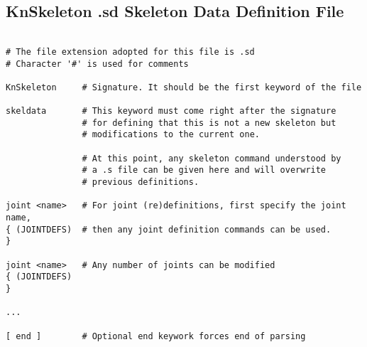 \subsection{KnSkeleton .sd Skeleton Data Definition File}

\begin{lstlisting}[title={}]

# The file extension adopted for this file is .sd
# Character '#' is used for comments

KnSkeleton     # Signature. It should be the first keyword of the file
                             
skeldata       # This keyword must come right after the signature
               # for defining that this is not a new skeleton but 
               # modifications to the current one.
               
               # At this point, any skeleton command understood by
               # a .s file can be given here and will overwrite 
               # previous definitions.

joint <name>   # For joint (re)definitions, first specify the joint name,
{ (JOINTDEFS)  # then any joint definition commands can be used.
}

joint <name>   # Any number of joints can be modified
{ (JOINTDEFS)  
}

...

[ end ]        # Optional end keywork forces end of parsing

\end{lstlisting}

